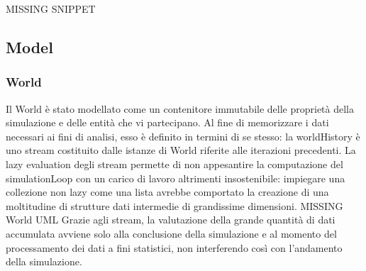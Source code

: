 MISSING SNIPPET

\subsection{Model}
\subsubsection{World}
Il World è stato modellato come un contenitore immutabile delle proprietà della simulazione e delle entità che vi partecipano. Al fine di memorizzare i dati necessari ai fini di analisi, esso è definito in termini di se stesso: la worldHistory è uno stream costituito dalle istanze di World riferite alle iterazioni precedenti. La lazy evaluation degli stream permette di non appesantire la computazione del simulationLoop con un carico di lavoro altrimenti insostenibile: impiegare una collezione non lazy come una lista avrebbe comportato la creazione di una moltitudine di strutture dati intermedie di grandissime dimensioni. 
MISSING World UML
Grazie agli stream, la valutazione della grande quantità di dati accumulata avviene solo alla conclusione della simulazione e al momento del processamento dei dati a fini statistici, non interferendo così con l’andamento della simulazione.

